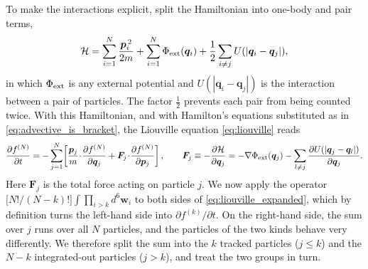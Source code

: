 \documentclass[12pt]{article}
\renewcommand{\vec}[1]{\bm{#1}}
\begin{document}
To make the interactions explicit, split the Hamiltonian into one-body
and pair terms,
%
\begin{equation}
  \mathcal H = \sum_{i=1}^{N} \frac{\vec p_i^{\,2}}{2m}
             + \sum_{i=1}^{N} \Phi_{\rm ext}(\vec q_i)
             + \frac12\sum_{i\neq j} U(|\vec q_i - \vec q_j|),
  \label{eq:H_split}
\end{equation}
%
in which $\Phi_{\rm ext}$ is any external potential and
$U(|\vec q_i-\vec q_j|)$ is the interaction between a pair of
particles.  The factor $\tfrac12$ prevents each pair from being counted
twice.  With this Hamiltonian, and with Hamilton's equations
substituted as in \eqref{eq:advective_is_bracket}, the Liouville
equation \eqref{eq:liouville} reads
%
\begin{equation}
  \frac{\partial f^{(N)}}{\partial t}
   = -\sum_{j=1}^{N}\!\left[
       \frac{\vec p_j}{m}\!\cdot\!\frac{\partial f^{(N)}}{\partial\vec q_j}
     + \vec F_j\!\cdot\!\frac{\partial f^{(N)}}{\partial\vec p_j}\right],
  \qquad
  \vec F_j \equiv -\frac{\partial\mathcal H}{\partial\vec q_j}
     = -\nabla\Phi_{\rm ext}(\vec q_j)
       - \sum_{l\neq j}\frac{\partial U(|\vec q_j - \vec q_l|)}{\partial\vec q_j}.
  \label{eq:liouville_expanded}
\end{equation}
%
Here $\vec F_j$ is the total force acting on particle $j$.  We now
apply the operator $\bigl[N!/(N-k)!\bigr]\int\prod_{i>k}d^6\vec w_i$ to
both sides of \eqref{eq:liouville_expanded}, which by definition turns
the left-hand side into $\partial f^{(k)}/\partial t$.  On the
right-hand side, the sum over $j$ runs over all $N$ particles, and the
particles of the two kinds behave very differently.  We therefore split
the sum into the $k$ tracked particles ($j\le k$) and the $N-k$
integrated-out particles ($j>k$), and treat the two groups in turn.
\end{document}
